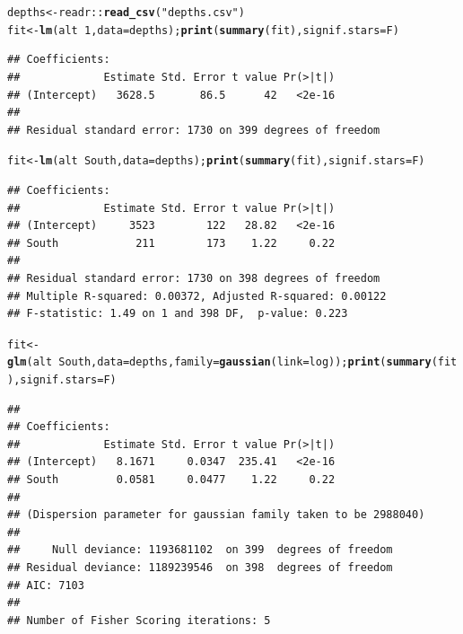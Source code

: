 \documentclass[10pt,handout]{beamer}\usepackage[]{graphicx}\usepackage[]{color}
\makeatletter
\newcommand{\hlnum}[1]{\textcolor[rgb]{0.686,0.059,0.569}{#1}}%
\newcommand{\hlstr}[1]{\textcolor[rgb]{0.192,0.494,0.8}{#1}}%
\newcommand{\hlopt}[1]{\textcolor[rgb]{0,0,0}{#1}}%
\newcommand{\hlstd}[1]{\textcolor[rgb]{0.345,0.345,0.345}{#1}}%
\newcommand{\hlkwb}[1]{\textcolor[rgb]{0.69,0.353,0.396}{#1}}%
\newcommand{\hlkwc}[1]{\textcolor[rgb]{0.333,0.667,0.333}{#1}}%
\newcommand{\hlkwd}[1]{\textcolor[rgb]{0.737,0.353,0.396}{\textbf{#1}}}%
\newenvironment{kframe}{%
 \def\at@end@of@kframe{}%
 \ifinner\ifhmode%
  \def\at@end@of@kframe{\end{minipage}}%
  \begin{minipage}{\columnwidth}%
 \fi\fi%
 \def\FrameCommand##1{\hskip\@totalleftmargin \hskip-\fboxsep
 \colorbox{shadecolor}{##1}\hskip-\fboxsep
     \hskip-\linewidth \hskip-\@totalleftmargin \hskip\columnwidth}%
 \MakeFramed {\advance\hsize-\width
   \@totalleftmargin\z@ \linewidth\hsize
   \@setminipage}}%
 {\par\unskip\endMakeFramed%
 \at@end@of@kframe}
\newenvironment{knitrout}{}{} %
\makeatother
\begin{document}
\begin{frame}
	\vspace*{-0.3in}

	
\begin{knitrout}\tiny
{}\color{fgcolor}\begin{kframe}
\begin{alltt}
\hlstd{depths} \hlkwb{<-} \hlstd{readr}\hlopt{::}\hlkwd{read_csv}\hlstd{(}\hlstr{"depths.csv"}\hlstd{)}
\hlstd{fit} \hlkwb{<-} \hlkwd{lm}\hlstd{(alt} \hlopt{~} \hlnum{1}\hlstd{,} \hlkwc{data} \hlstd{= depths);} \hlkwd{print}\hlstd{(}\hlkwd{summary}\hlstd{(fit),} \hlkwc{signif.stars} \hlstd{= F)}
\end{alltt}
\begin{verbatim}
## Coefficients:
##             Estimate Std. Error t value Pr(>|t|)
## (Intercept)   3628.5       86.5      42   <2e-16
## 
## Residual standard error: 1730 on 399 degrees of freedom
\end{verbatim}
\begin{alltt}
\hlstd{fit} \hlkwb{<-} \hlkwd{lm}\hlstd{(alt} \hlopt{~} \hlstd{South,} \hlkwc{data} \hlstd{= depths);} \hlkwd{print}\hlstd{(}\hlkwd{summary}\hlstd{(fit),} \hlkwc{signif.stars} \hlstd{= F)}
\end{alltt}
\begin{verbatim}
## Coefficients:
##             Estimate Std. Error t value Pr(>|t|)
## (Intercept)     3523        122   28.82   <2e-16
## South            211        173    1.22     0.22
## 
## Residual standard error: 1730 on 398 degrees of freedom
## Multiple R-squared: 0.00372,	Adjusted R-squared: 0.00122 
## F-statistic: 1.49 on 1 and 398 DF,  p-value: 0.223
\end{verbatim}
\begin{alltt}
\hlstd{fit} \hlkwb{<-} \hlkwd{glm}\hlstd{(alt} \hlopt{~} \hlstd{South,} \hlkwc{data} \hlstd{= depths,} \hlkwc{family} \hlstd{=} \hlkwd{gaussian}\hlstd{(}\hlkwc{link}\hlstd{=log));} \hlkwd{print}\hlstd{(}\hlkwd{summary}\hlstd{(fit),} \hlkwc{signif.stars} \hlstd{= F)}
\end{alltt}
\begin{verbatim}
## 
## Coefficients:
##             Estimate Std. Error t value Pr(>|t|)
## (Intercept)   8.1671     0.0347  235.41   <2e-16
## South         0.0581     0.0477    1.22     0.22
## 
## (Dispersion parameter for gaussian family taken to be 2988040)
## 
##     Null deviance: 1193681102  on 399  degrees of freedom
## Residual deviance: 1189239546  on 398  degrees of freedom
## AIC: 7103
## 
## Number of Fisher Scoring iterations: 5
\end{verbatim}
\end{kframe}
\end{knitrout}
	
\end{frame}
\end{document}
